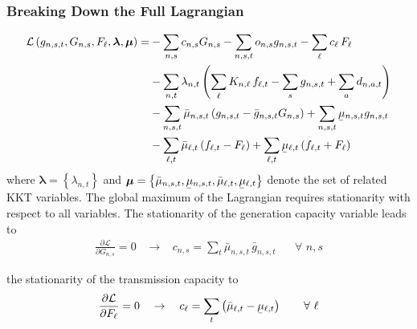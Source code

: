 \documentclass[11pt]{article}
\newcommand{\ubar}[1]{\underaccent{\bar}{#1}}
\newcommand{\generation}[1][n]{g_{#1,s,t}}
\newcommand{\generationpotential}{\bar{g}_{n,s,t}}
\newcommand{\capacityGeneration}{G_{n,s}}
\newcommand{\capacityFlow}{F_{\ell}}
\newcommand{\capexGeneration}{c_{n,s}}
\newcommand{\capexFlow}{c_{\ell}}
\newcommand{\opexGeneration}[1][n]{o_{#1,s}}
\newcommand{\demand}[1][n]{d_{#1,a,t}}
\newcommand{\incidence}[1][n]{K_{#1,\ell}}
\newcommand{\mulowergeneration}[1][n]{\ubar{\mu}_{#1,s,t}}
\newcommand{\muuppergeneration}[1][n]{\bar{\mu}_{#1,s,t}}
\newcommand{\mulowerflow}{\ubar{\mu}_{\ell,t}}
\newcommand{\muupperflow}{\bar{\mu}_{\ell,t}}
\newcommand{\lmp}[1][n]{\lambda_{#1,t}}
\newcommand{\flow}{f_{\ell,t}}
\newcommand{\cycle}{C_{\ell,c}}
\newcommand{\impedance}{x_\ell}
\newcommand{\cycleprice}{\lambda_{c,t}}
\newcommand{\lagrangian}{\mathcal{L}}
\newcommand{\Forall}[1]{\hspace{20pt} \forall \,\, #1 }
\newcommand{\pdv}[2]{\frac{\partial #1}{\partial #2}}
\begin{document}
\subsubsection*{Breaking Down the Full Lagrangian}
\begin{align}
 \lagrangian\left(\generation, \capacityGeneration, \capacityFlow, \boldsymbol{\lambda}, \boldsymbol{\mu} \right)   = &- \sum_{n,s} \capexGeneration \capacityGeneration - \sum_{n, s, t} \opexGeneration \generation - \sum_{\ell} \capexFlow \, \capacityFlow  \\
 &- \sum_{n,t} \lmp \left(\sum_\ell \incidence \, \flow  - \sum_s \generation + \sum_a \demand  \right)  \\ 
 &- \sum_{n,s,t} \muuppergeneration \left( \generation - \generationpotential \capacityGeneration \right)  + \sum_{n,s,t} \mulowergeneration \generation  \\
 &- \sum_{\ell,t} \muupperflow \left( \flow - \capacityFlow \right) + \sum_{\ell,t} \mulowerflow \left( \flow + \capacityFlow \right)     
\end{align}
% 
where $\boldsymbol{\lambda} = \left\lbrace \lmp \right\rbrace $ and $\boldsymbol{\mu} = \left\lbrace \muuppergeneration, \mulowergeneration, \muupperflow, \mulowerflow \right\rbrace $ denote the set of related KKT variables. The global maximum of the Lagrangian requires stationarity with respect to all variables. The stationarity of the generation capacity variable leads to 
\begin{align}
 \pdv{\lagrangian}{\capacityGeneration}  = 0 \hspace{10pt} \rightarrow \hspace{10pt} \capexGeneration =  \sum_t \muuppergeneration \, \generationpotential  \Forall{n,s}
 \label{eq:capexGeneration_duality}
\end{align}

the stationarity of the transmission capacity to
\begin{align}
 \pdv{\lagrangian}{\capacityFlow} = 0 \hspace{10pt} \rightarrow \hspace{10pt} \capexFlow =  \sum_t \left( \muupperflow - \mulowerflow \right) \Forall{\ell}
 \label{eq:capexFlow_duality}
\end{align}
\end{document}
